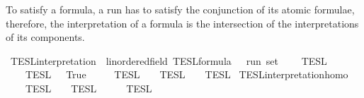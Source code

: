 \begin{isabellebody}
\isadelimdocument
%
\endisadelimdocument
%
\isatagdocument
%
\isamarkuptrue%
%
\endisatagdocument
{\isafolddocument}%
%
\isadelimdocument
%
\endisadelimdocument
%
\begin{isamarkuptext}%
To satisfy a formula, a run has to satisfy the conjunction of its atomic 
  formulae, therefore, the interpretation of a formula is the intersection
  of the interpretations of its components.%
\end{isamarkuptext}\isamarkuptrue%
\isamarkupfalse%
\ TESL{\isacharunderscore}interpretation\ {\isacharcolon}{\isacharcolon}\ {\isacartoucheopen}{\isacharparenleft}{\isacharprime}{\isasymtau}{\isacharcolon}{\isacharcolon}linordered{\isacharunderscore}field{\isacharparenright}\ TESL{\isacharunderscore}formula\ {\isasymRightarrow}\ {\isacharprime}{\isasymtau}\ run\ set{\isacartoucheclose}\isanewline
\ \ {\isacharparenleft}{\isachardoublequoteopen}{\isasymlbrakk}{\isasymlbrakk}\ {\isacharunderscore}\ {\isasymrbrakk}{\isasymrbrakk}\isactrlsub T\isactrlsub E\isactrlsub S\isactrlsub L{\isachardoublequoteclose}{\isacharparenright}\isanewline
{}\isanewline
\ \ {\isacartoucheopen}{\isasymlbrakk}{\isasymlbrakk}\ {\isacharbrackleft}{\isacharbrackright}\ {\isasymrbrakk}{\isasymrbrakk}\isactrlsub T\isactrlsub E\isactrlsub S\isactrlsub L\ {\isacharequal}\ {\isacharbraceleft}{\isacharunderscore}{\isachardot}\ True{\isacharbraceright}{\isacartoucheclose}\isanewline
{\isacharbar}\ {\isacartoucheopen}{\isasymlbrakk}{\isasymlbrakk}\ {\isasymphi}\ {\isacharhash}\ {\isasymPhi}\ {\isasymrbrakk}{\isasymrbrakk}\isactrlsub T\isactrlsub E\isactrlsub S\isactrlsub L\ {\isacharequal}\ {\isasymlbrakk}\ {\isasymphi}\ {\isasymrbrakk}\isactrlsub T\isactrlsub E\isactrlsub S\isactrlsub L\ {\isasyminter}\ {\isasymlbrakk}{\isasymlbrakk}\ {\isasymPhi}\ {\isasymrbrakk}{\isasymrbrakk}\isactrlsub T\isactrlsub E\isactrlsub S\isactrlsub L{\isacartoucheclose}\isanewline
\isanewline
{}\isamarkupfalse%
\ TESL{\isacharunderscore}interpretation{\isacharunderscore}homo{\isacharcolon}\isanewline
\ \ {\isacartoucheopen}{\isasymlbrakk}\ {\isasymphi}\ {\isasymrbrakk}\isactrlsub T\isactrlsub E\isactrlsub S\isactrlsub L\ {\isasyminter}\ {\isasymlbrakk}{\isasymlbrakk}\ {\isasymPhi}\ {\isasymrbrakk}{\isasymrbrakk}\isactrlsub T\isactrlsub E\isactrlsub S\isactrlsub L\ {\isacharequal}\ {\isasymlbrakk}{\isasymlbrakk}\ {\isasymphi}\ {\isacharhash}\ {\isasymPhi}\ {\isasymrbrakk}{\isasymrbrakk}\isactrlsub T\isactrlsub E\isactrlsub S\isactrlsub L{\isacartoucheclose}\isanewline

\end{isabellebody}
